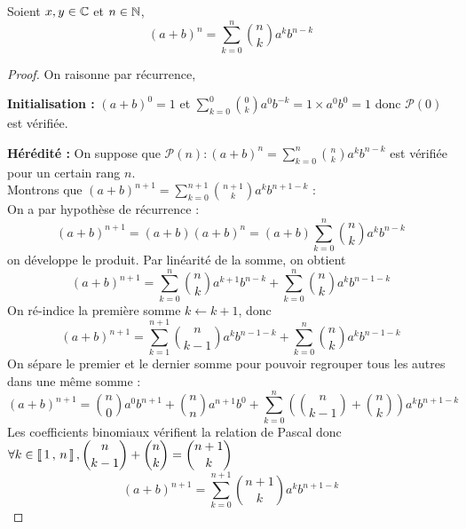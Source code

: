 \documentclass{fancybook}
\begin{document}
\begin{theorem}
\label{somme:binome:Newton}
Soient $x, y \in \mathbb{C}$ et $n \in \mathbb{N}$,
\[
(a+b)^n = \displaystyle\sum\limits_{k=0}^{n} \displaystyle\binom{n}{k}a^k b^{n - k}
\]
\end{theorem}

\begin{proof}
On raisonne par récurrence,

\textbf{Initialisation :} $(a+b)^0 = 1$ et $\displaystyle\sum\limits_{k=0}^{0} \binom{0}{k}a^0 b^{- k} = 1 \times a^0 b^0 = 1$ donc $\mathcal{P}(0)$ est vérifiée.

\textbf{Hérédité :} On suppose que $\mathcal{P}(n) : (a+b)^n = \displaystyle\sum\limits_{k=0}^{n} \binom{n}{k}a^k b^{n - k}$ est vérifiée pour un certain rang $n$. \\
Montrons que $(a+b)^{n+1} = \displaystyle\sum\limits_{k=0}^{n+1} \binom{n+1}{k}a^k b^{n+1 - k}$ :\\
On a par hypothèse de récurrence :
\[
(a+b)^{n+1} = (a+b) (a+b)^{n} = (a+b) \displaystyle\sum\limits_{k=0}^{n} \binom{n}{k}a^k b^{n - k}
\]
on développe le produit. Par linéarité de la somme, on obtient
\[
(a+b)^{n+1} =  \displaystyle\sum\limits_{k=0}^{n} \binom{n}{k}a^{k+1} b^{n - k} + \displaystyle\sum\limits_{k=0}^{n} \binom{n}{k}a^{k} b^{n -1 - k}
\]
On ré-indice la première somme $k \leftarrow k+1$, donc
\[
(a+b)^{n+1} =  \displaystyle\sum\limits_{k=1}^{n+1}\binom{n}{k-1}a^{k} b^{n - 1 - k} + \displaystyle\sum\limits_{k=0}^{n} \binom{n}{k}a^{k} b^{n -1 - k}
\]
On sépare le premier et le dernier somme pour pouvoir regrouper tous les autres dans une même somme :
\[
(a+b)^{n+1} = \binom{n}{0}a^{0} b^{n +1} + \binom{n}{n}a^{n+1} b^{0} +\displaystyle\sum\limits_{k=0}^{n} \left(\binom{n}{k-1}+\binom{n}{k}\right)a^{k} b^{n +1 - k}
\]
Les coefficients binomiaux vérifient la relation de Pascal donc $\displaystyle\forall k \in \left\llbracket \, 1 \, , \, n \, \right\rrbracket, \binom{n}{k-1}+\binom{n}{k}=\binom{n+1}{k}$\\
\[
(a+b)^{n+1} = \displaystyle\sum\limits_{k=0}^{n+1} \binom{n+1}{k}a^k b^{n+1 - k}
\]
\end{proof}
\end{document}

